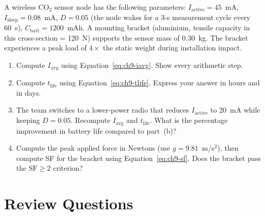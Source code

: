 A wireless CO$_2$ sensor node has the following parameters:
$I_{\text{active}} = 45$~mA, $I_{\text{sleep}} = 0.08$~mA, $D = 0.05$
(the node wakes for a 3-s measurement cycle every 60~s), $C_{\text{batt}} = 1200$~mAh.
A mounting bracket (aluminium, tensile capacity in this cross-section = 120~N)
supports the sensor mass of 0.30~kg.
The bracket experiences a peak load of $4\times$ the static weight during
installation impact.

\begin{enumerate}
  \item[(a)] Compute $I_{\text{avg}}$ using Equation~\ref{eq:ch9-iavg}.
             Show every arithmetic step.
  \item[(b)] Compute $t_{\text{life}}$ using Equation~\ref{eq:ch9-tlife}.
             Express your answer in hours and in days.
  \item[(c)] The team switches to a lower-power radio that reduces
             $I_{\text{active}}$ to 20~mA while keeping $D = 0.05$.
             Recompute $I_{\text{avg}}$ and $t_{\text{life}}$.
             What is the percentage improvement in battery life compared to part~(b)?
  \item[(d)] Compute the peak applied force in Newtons (use $g = 9.81$~m/s$^2$),
             then compute SF for the bracket using Equation~\ref{eq:ch9-sf}.
             Does the bracket pass the $\mathrm{SF} \geq 2$ criterion?
\end{enumerate}

\section{Review Questions}
\label{sec:ch9-review}

